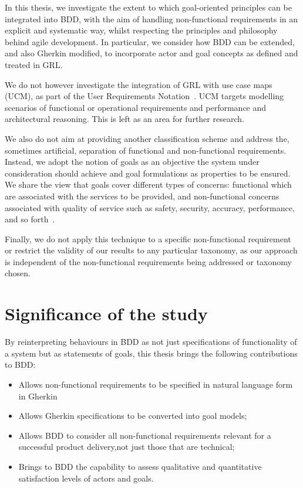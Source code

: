 \documentclass[dissertation,final]{softeng}
\newcommand{\nfrs}{non-functional requirements\xspace}
\begin{document}
{In this thesis, we investigate the extent to which goal-oriented principles can be integrated into BDD, with the aim of handling non-functional requirements in an explicit and systematic way, whilst respecting the principles and philosophy behind agile development. In particular, we consider how BDD can be extended, and also Gherkin modified, to incorporate actor and goal concepts as defined and treated in GRL.

We do not however investigate the integration of GRL with use case maps (UCM), as part of the User Requirements Notation~\citep{liu2004designing}. UCM targets modelling scenarios of functional or operational requirements and performance and architectural reasoning. This is left as an area for further research.

We also do not aim at providing another classification scheme and address the, sometimes artificial, separation of functional and non-functional requirements. Instead, we adopt the notion of goals as an objective the system under consideration should achieve and goal formulations as properties to be ensured. We share the view that goals cover different types of concerns: functional which are associated with the services to be provided, and non-functional concerns associated with quality of service such as safety, security, accuracy, performance, and so forth~\citep{Lamsweerde:2001wpba}.

Finally, we do not apply this technique to a specific non-functional requirement or restrict the validity of our results to any particular taxonomy, as our approach is independent of the \nfrs being addressed or taxonomy chosen.

\section{Significance of the study}

By reinterpreting behaviours in BDD as not just specifications of functionality of a system but as statements of goals, this thesis brings the following contributions to BDD:

\begin{center}
\begin{itemize}
\item Allows non-functional requirements to be specified in natural language form in Gherkin
\item Allows Gherkin specifications to be converted into goal models;
\item Allows BDD to consider all non-functional requirements relevant for a successful product delivery,not just those that are technical;
\item Brings to BDD the capability to assess qualitative and quantitative satisfaction levels of actors and goals.
\end{itemize}
\end{center}

}
\end{document}
